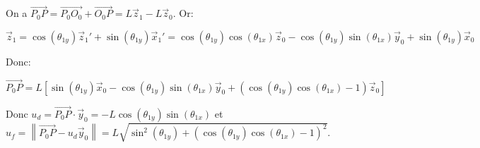 \ifprof
\begin{corrige}
On a $\overrightarrow{P_0P} = \overrightarrow{P_0 O_0} + \overrightarrow{O_0 P} = L \overrightarrow{z}_1 - L \overrightarrow{z}_0$. Or:

$$ \overrightarrow{z}_1 = \cos(\theta_{1y})\overrightarrow{z}_1' + \sin(\theta_{1y})\overrightarrow{x}_1' = \cos(\theta_{1y})\cos(\theta_{1x})\overrightarrow{z}_0 - \cos(\theta_{1y})\sin(\theta_{1x})\overrightarrow{y}_0 + \sin(\theta_{1y})\overrightarrow{x}_0  $$

Donc:

$$ \boxed{\overrightarrow{P_0P} = L\left[ \sin(\theta_{1y})\overrightarrow{x}_0 - \cos(\theta_{1y})\sin(\theta_{1x})\overrightarrow{y}_0 + \left( \cos(\theta_{1y})\cos(\theta_{1x}) - 1 \right)\overrightarrow{z}_0 \right]} $$

Donc $\boxed{u_d = \overrightarrow{P_0P}\cdot \overrightarrow{y}_0 = -L \cos(\theta_{1y})\sin(\theta_{1x})}$ et $\boxed{u_f = \left\|\overrightarrow{P_0P}-u_d\overrightarrow{y}_0\right\| = L\sqrt{\sin^2(\theta_{1y}) + \left( \cos(\theta_{1y})\cos(\theta_{1x}) - 1 \right)^2}}$.

\end{corrige}
\else
\fi


